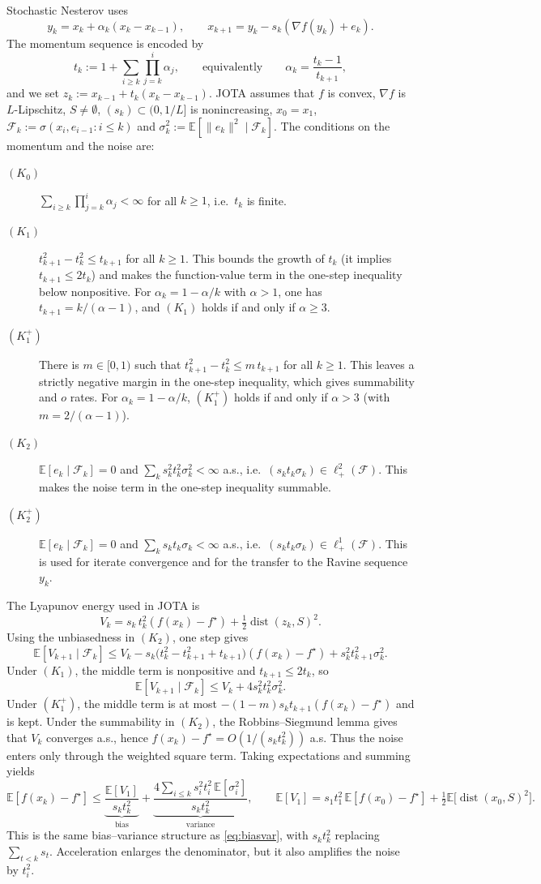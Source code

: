 \documentclass[11pt]{article}
\newcommand{\E}{\mathbb{E}}
\newcommand{\F}{\mathcal{F}}
\newcommand{\dist}{\operatorname{dist}}
\begin{document}
Stochastic Nesterov uses
\[
y_k=x_k+\alpha_k(x_k-x_{k-1}),\qquad
x_{k+1}=y_k-s_k(\nabla f(y_k)+e_k).
\]
The momentum sequence is encoded by
\[
t_k:=1+\sum_{i\ge k}\prod_{j=k}^{i}\alpha_j,
\qquad\text{equivalently}\qquad
\alpha_k=\frac{t_k-1}{t_{k+1}},
\]
and we set $z_k:=x_{k-1}+t_k(x_k-x_{k-1})$. JOTA \citep[Theorem~3.1]{attouch2026ravine} assumes that $f$ is convex, $\nabla f$ is $L$-Lipschitz, $S\neq\emptyset$, $(s_k)\subset(0,1/L]$ is nonincreasing, $x_0=x_1$, $\F_k:=\sigma(x_i,e_{i-1}:i\le k)$ and $\sigma_k^2:=\E[\|e_k\|^2\mid\F_k]$. The conditions on the momentum and the noise are:
\begin{description}
\item[$(K_0)$] $\sum_{i\ge k}\prod_{j=k}^{i}\alpha_j<\infty$ for all $k\ge1$, i.e.\ $t_k$ is finite.
\item[$(K_1)$] $t_{k+1}^2-t_k^2\le t_{k+1}$ for all $k\ge1$. This bounds the growth of $t_k$ (it implies $t_{k+1}\le 2t_k$) and makes the function-value term in the one-step inequality below nonpositive. For $\alpha_k=1-\alpha/k$ with $\alpha>1$, one has $t_{k+1}=k/(\alpha-1)$, and $(K_1)$ holds if and only if $\alpha\ge3$.
\item[$(K_1^+)$] There is $m\in[0,1)$ such that $t_{k+1}^2-t_k^2\le m\,t_{k+1}$ for all $k\ge1$. This leaves a strictly negative margin in the one-step inequality, which gives summability and $o$ rates. For $\alpha_k=1-\alpha/k$, $(K_1^+)$ holds if and only if $\alpha>3$ (with $m=2/(\alpha-1)$).
\item[$(K_2)$] $\E[e_k\mid\F_k]=0$ and $\sum_k s_k^2t_k^2\sigma_k^2<\infty$ a.s., i.e.\ $(s_kt_k\sigma_k)\in\ell^2_+(\F)$. This makes the noise term in the one-step inequality summable.
\item[$(K_2^+)$] $\E[e_k\mid\F_k]=0$ and $\sum_k s_kt_k\sigma_k<\infty$ a.s., i.e.\ $(s_kt_k\sigma_k)\in\ell^1_+(\F)$. This is used for iterate convergence and for the transfer to the Ravine sequence $y_k$.
\end{description}

The Lyapunov energy used in JOTA is
\[
V_k=s_k\,t_k^2(f(x_k)-f^\star)+\tfrac12\dist(z_k,S)^2.
\]
Using the unbiasedness in $(K_2)$, one step gives \citep[eq.~(18)]{attouch2026ravine}
\[
\E[V_{k+1}\mid\F_k]\le V_k-s_k\bigl(t_k^2-t_{k+1}^2+t_{k+1}\bigr)(f(x_k)-f^\star)+s_k^2t_{k+1}^2\sigma_k^2 .
\]
Under $(K_1)$, the middle term is nonpositive and $t_{k+1}\le2t_k$, so
\[
\E[V_{k+1}\mid\F_k]\le V_k+4s_k^2t_k^2\sigma_k^2 .
\]
Under $(K_1^+)$, the middle term is at most $-(1-m)s_kt_{k+1}(f(x_k)-f^\star)$ and is kept. Under the summability in $(K_2)$, the Robbins--Siegmund lemma gives that $V_k$ converges a.s., hence $f(x_k)-f^\star=O(1/(s_kt_k^2))$ a.s. Thus the noise enters only through the weighted square term. Taking expectations and summing yields \citep[Theorem~3.1(i)]{attouch2026ravine}
\[
\E[f(x_k)-f^\star]\le
\underbrace{\frac{\E[V_1]}{s_kt_k^2}}_{\text{bias}}+
\underbrace{\frac{4\sum_{i\le k}s_i^2t_i^2\,\E[\sigma_i^2]}{s_kt_k^2}}_{\text{variance}},
\qquad
\E[V_1]=s_1t_1^2\,\E[f(x_0)-f^\star]+\tfrac12\E\bigl[\dist(x_0,S)^2\bigr].
\]
This is the same bias--variance structure as \eqref{eq:biasvar}, with $s_kt_k^2$ replacing $\sum_{t<k}s_t$. Acceleration enlarges the denominator, but it also amplifies the noise by $t_i^2$.
\end{document}
